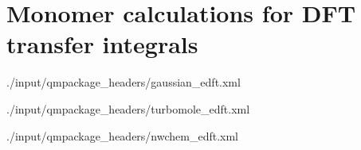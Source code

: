 \section{Monomer calculations for DFT transfer integrals}
 {./input/qmpackage_headers/gaussian_edft.xml}

 {./input/qmpackage_headers/turbomole_edft.xml}

 {./input/qmpackage_headers/nwchem_edft.xml}